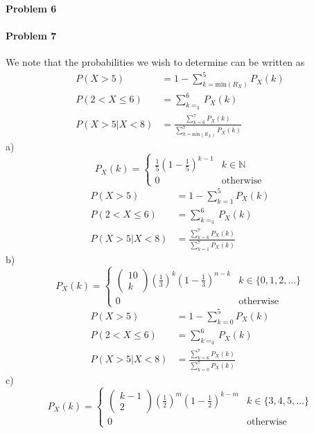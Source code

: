 \paragraph{Problem 6}
\paragraph{Problem 7}
We note that the probabilities we wish to determine can be written as
\begin{align*}
    P(X>5)&=1-\sum_{k=\text{min}(R_{X})}^{5}P_{X}(k) \\
    P(2<X\leq 6)&=\sum_{k=_{3}}^{6}P_{X}(k) \\
    P(X>5|X<8)&=\frac{\sum_{k=6}^{7}P_{X}(k)}{\sum_{k=\text{min}(R_{X})}^{7}P_{X}(k)}
\end{align*}
a)
\[
    P_{X}(k)=\begin{cases}\frac{1}{5}\left(1-\frac{1}{5}\right)^{k-1} & k\in \mathbb{N} \\ 0 & \text{otherwise}\end{cases}
\]
\begin{align*}
    P(X>5)&=1-\sum_{k=1}^{5}P_{X}(k) \\
    P(2<X\leq 6)&=\sum_{k=_{3}}^{6}P_{X}(k) \\
    P(X>5|X<8)&=\frac{\sum_{k=6}^{7}P_{X}(k)}{\sum_{k=1}^{7}P_{X}(k)}
\end{align*}
b)
\[
    P_{X}(k)=\begin{cases}\begin{pmatrix}10\\k\end{pmatrix}\left(\frac{1}{3}\right)^{k}\left(1-\frac{1}{3}\right)^{n-k} & k\in\{0,1,2,\ldots\} \\ 0 & \text{otherwise}\end{cases}
\]
\begin{align*}
    P(X>5)&=1-\sum_{k=0}^{5}P_{X}(k) \\
    P(2<X\leq 6)&=\sum_{k=_{3}}^{6}P_{X}(k) \\
    P(X>5|X<8)&=\frac{\sum_{k=6}^{7}P_{X}(k)}{\sum_{k=0}^{7}P_{X}(k)}
\end{align*}
c)
\[
    P_{X}(k)=\begin{cases}\begin{pmatrix}k-1 \\ 2\end{pmatrix}\left(\frac{1}{2}\right)^{m}\left(1-\frac{1}{2}\right)^{k-m} & k\in\{3,4,5,\ldots\} \\ 0 & \text{otherwise}\end{cases}
\]
